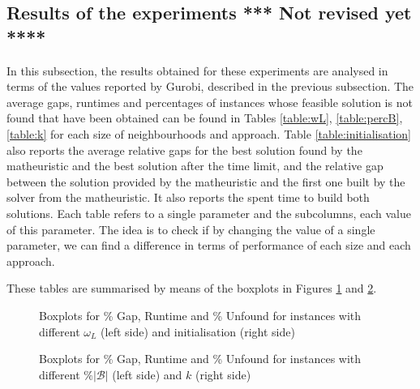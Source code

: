 \documentclass[a4paper,  review, authoryear, 1p.]{elsarticle}
\newcommand{\JP}[1]{{\color{armygreen}#1}}
\newcommand{\CV}[1]{{\color{blue}#1}}
\begin{document}
		\subsection{Results of the experiments \JP{*** Not revised yet ****}}
		\CV{In this subsection, the results obtained for these experiments are analysed in terms of the values reported by Gurobi, described in the previous subsection. 
		The average gaps, runtimes and percentages of instances whose feasible solution is not found that have been obtained can be found in Tables \ref{table:wL}, \ref{table:percB}, \ref{table:k} for each size of neighbourhoods and approach. Table \ref{table:initialisation} also reports the average relative gaps for the best solution found by the matheuristic and the best solution after the time limit, and the relative gap between the solution provided by the matheuristic and the first one built by the solver from the matheuristic. It also reports the spent time to build both solutions. Each table refers to a single parameter and the subcolumns, each value of this parameter. The idea is to check if by changing the value of a single parameter, we can find a difference in terms of performance of each size and each approach. }

		
		
		
		
		
		\CV{
		These tables are summarised by means of the boxplots in Figures \ref{fig:results_wL} and \ref{fig:results_percentage}}.

		\begin{figure}[h!]
			\centering
			\caption{Boxplots for \% Gap, Runtime and \% Unfound for instances with different $\omega_L$ (left side) and initialisation (right side)}
			
			\label{fig:results_wL}
			
		\end{figure}

		\begin{figure}[h!]
			\centering
			\caption{Boxplots for \% Gap, Runtime and \% Unfound for instances with different $\%|\mathcal B|$ (left side) and $k$ (right side)}

			
			\label{fig:results_percentage}
					
		\end{figure}
\end{document}
